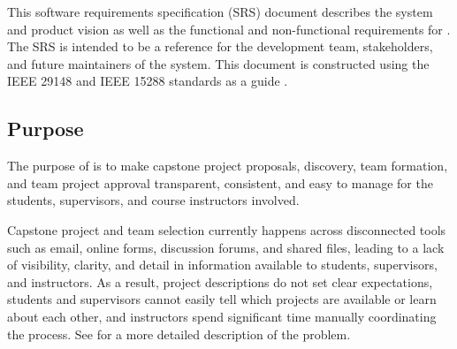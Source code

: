 \documentclass[12pt]{article}
\newcounter{tin}
\begin{document}


  This software requirements specification (SRS) document describes the system and product vision
  as well as the functional and non-functional requirements for \projname{}. The SRS is intended
  to be a reference for the development team, stakeholders, and future maintainers of the system.
  This document is constructed using the IEEE 29148 and IEEE 15288 standards
  as a guide \citep{ISOIECIEEE29148_2018, ISOIECIEEE15288_2023}.

  \subsection{Purpose}



  The purpose of \projname{} is to make capstone project proposals, discovery, team formation, and
  team project approval transparent, consistent, and easy to manage for the students, supervisors, and
  course instructors involved.


  Capstone project and team selection currently happens across disconnected tools such as email,
  online forms, discussion forums, and shared files, leading to a lack of visibility, clarity, and detail in
  information available to students, supervisors, and instructors. As a result, project descriptions do not set clear
  expectations, students and supervisors cannot easily tell which projects are available or learn about each other, and
  instructors spend significant time manually coordinating the process.
  See  for a more detailed description of the problem.
\end{document}
